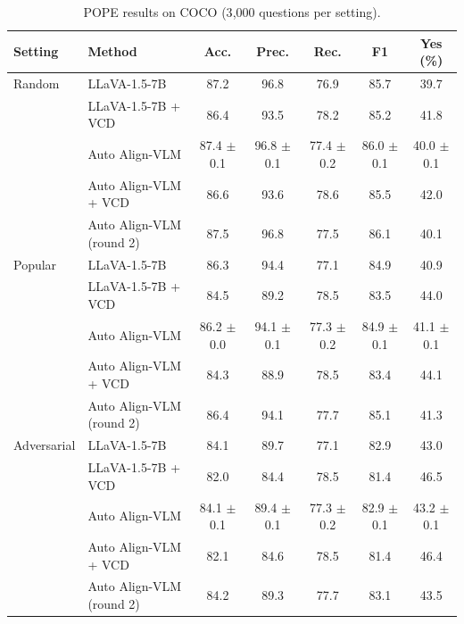 \begin{table}[t]
\centering
\small
\caption{POPE results on COCO (3{,}000 questions per setting).}
\label{tab:pope}
\begin{tabular}{llccccc}
\toprule
Setting & Method & Acc. & Prec. & Rec. & F1 & Yes (\%) \\
\midrule
Random & LLaVA-1.5-7B & 87.2 & 96.8 & 76.9 & 85.7 & 39.7 \\
 & LLaVA-1.5-7B + VCD & 86.4 & 93.5 & 78.2 & 85.2 & 41.8 \\
 & Auto Align-VLM & 87.4 $\pm$ 0.1 & 96.8 $\pm$ 0.1 & 77.4 $\pm$ 0.2 & 86.0 $\pm$ 0.1 & 40.0 $\pm$ 0.1 \\
 & Auto Align-VLM + VCD & 86.6 & 93.6 & 78.6 & 85.5 & 42.0 \\
 & Auto Align-VLM (round 2) & 87.5 & 96.8 & 77.5 & 86.1 & 40.1 \\
\midrule
Popular & LLaVA-1.5-7B & 86.3 & 94.4 & 77.1 & 84.9 & 40.9 \\
 & LLaVA-1.5-7B + VCD & 84.5 & 89.2 & 78.5 & 83.5 & 44.0 \\
 & Auto Align-VLM & 86.2 $\pm$ 0.0 & 94.1 $\pm$ 0.1 & 77.3 $\pm$ 0.2 & 84.9 $\pm$ 0.1 & 41.1 $\pm$ 0.1 \\
 & Auto Align-VLM + VCD & 84.3 & 88.9 & 78.5 & 83.4 & 44.1 \\
 & Auto Align-VLM (round 2) & 86.4 & 94.1 & 77.7 & 85.1 & 41.3 \\
\midrule
Adversarial & LLaVA-1.5-7B & 84.1 & 89.7 & 77.1 & 82.9 & 43.0 \\
 & LLaVA-1.5-7B + VCD & 82.0 & 84.4 & 78.5 & 81.4 & 46.5 \\
 & Auto Align-VLM & 84.1 $\pm$ 0.1 & 89.4 $\pm$ 0.1 & 77.3 $\pm$ 0.2 & 82.9 $\pm$ 0.1 & 43.2 $\pm$ 0.1 \\
 & Auto Align-VLM + VCD & 82.1 & 84.6 & 78.5 & 81.4 & 46.4 \\
 & Auto Align-VLM (round 2) & 84.2 & 89.3 & 77.7 & 83.1 & 43.5 \\
\bottomrule
\end{tabular}
\end{table}
